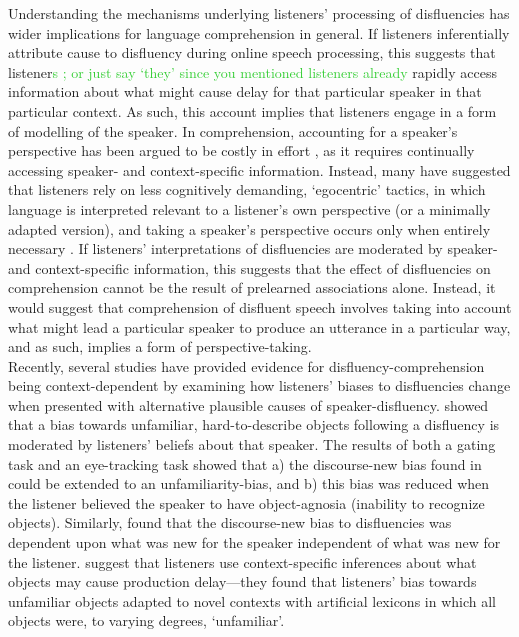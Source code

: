 \documentclass[man]{apa6}
\newcommand\thenote[1]{\textcolor{LimeGreen}{#1}}
\begin{document}
Understanding the mechanisms underlying listeners' processing of disfluencies has wider implications for language comprehension in general. 
If listeners inferentially attribute cause to disfluency during online speech processing, this suggests that listener\thenote{s ; or just say `they' since you mentioned listeners already} rapidly access information about what might cause delay for that particular speaker in that particular context.
As such, this account implies that listeners engage in a form of modelling of the speaker.
In comprehension, accounting for a speaker's perspective has been argued to be costly in effort \citep{Lin2010}, as it requires continually accessing speaker- and context-specific information. 
Instead, many have suggested that listeners rely on less cognitively demanding, `egocentric' tactics, in which language is interpreted relevant to a listener's own perspective (or a minimally adapted version), and taking a speaker's perspective occurs only when entirely necessary \citep{Barr2004, Barr2014, Pickering2004, Kronmuller2007}.
If listeners' interpretations of disfluencies are moderated by speaker- and context-specific information, this suggests that the effect of disfluencies on comprehension cannot be the result of prelearned associations alone.
Instead, it would suggest that comprehension of disfluent speech involves taking into account what might lead a particular speaker to produce an utterance in a particular way, and as such, implies a form of perspective-taking.\\

Recently, several studies have provided evidence for disfluency-comprehension being context-dependent by examining how listeners' biases to disfluencies change when presented with alternative plausible causes of speaker-disfluency. 
\citet{Arnold2007} showed that a bias towards unfamiliar, hard-to-describe objects following a disfluency is moderated by listeners' beliefs about that speaker. 
The results of both a gating task and an eye-tracking task showed that a) the discourse-new bias found in \citet{Arnold2004} could be extended to an unfamiliarity-bias, and b) this bias was reduced when the listener believed the speaker to have object-agnosia (inability to recognize objects). 
Similarly, \citet{Barr2010} found that the discourse-new bias to disfluencies was dependent upon what was new for the speaker independent of what was new for the listener.
\citet{Heller2015} suggest that listeners use context-specific inferences about what objects may cause production delay---they found that listeners' bias towards unfamiliar objects adapted to novel contexts with artificial lexicons in which all objects were, to varying degrees, `unfamiliar'.\\
\end{document}
